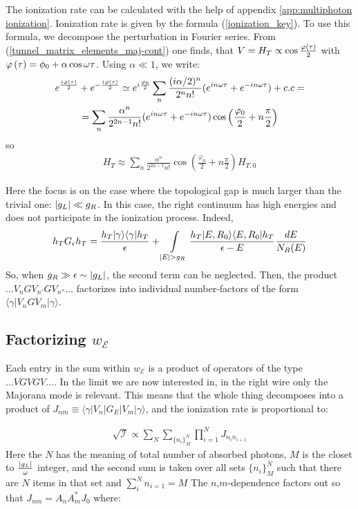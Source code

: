 The ionization rate can be calculated with the help of appendix \ref{app:multiphoton ionization}. Ionization rate is given by the formula   (\ref{ionization_key}). To use this formula, we decompose the  perturbation in Fourier series. From  (\ref{tunnel_matrix_elements_maj-cont}) one finds, that $ V=H_T\propto\cos\frac{\varphi\left(\tau\right)}{2} $ with $ \varphi\left(\tau\right)=\phi_{0}+\alpha\cos\omega \tau $. Using $ \alpha\ll1 $, we write:
\begin{multline}
	e^{\frac{i\varphi\left(\tau\right)}{2}}+e^{-\frac{i\varphi\left(\tau\right)}{2}}\simeq e^{i\frac{\varphi_{0}}{2}}\sum_{n}\frac{(i\alpha/2)^{n}}{2^{n}n!}(e^{in\omega \tau}+e^{-in\omega \tau})+c.c=
	\\
	=\sum_{n}\frac{\alpha{}^{n}}{2^{2n-1}n!}(e^{in\omega \tau}+e^{-in\omega \tau})\cos\left(\frac{\varphi_{0}}{2}+n\frac{\pi}{2}\right)
\end{multline}
so 
\begin{gather}
	H_T
	\approx
	\sum_{n}
	\frac{\alpha^{n}}{2^{2n-1}n!}\cos\left(\frac{\varphi_{0}}{2}+n\frac{\pi}{2}\right)H_{T,0}
\end{gather}

Here the focus is on the case where the topological gap is much larger than the trivial one: $ \left|g_L\right|\ll g_R $. In this case, the right continuum has high energies and does not participate in the ionization process. Indeed,
\begin{gather}
	h_T G_{\epsilon} h_T
	=
	\frac{h_T|\gamma\rangle\langle\gamma|h_T}{\epsilon}
	+
	\intop_{|E|>g_{R}}
	\frac{h_T|E,R_0\rangle\langle E,R_0|h_T}{\epsilon-E}\frac{dE}{N_{R}(E)}
\end{gather}
So, when $ g_{R}\gg\epsilon\sim \left|g_L\right| $, the second term can be neglected. Then, the product $ \dots V_{n}GV_{n'}GV_{n''}\dots $ factorizes into individual number-factors of the form $ \langle\gamma|V_{n}GV_{m}|\gamma\rangle $.

\subsection{Factorizing $ w_\mathcal{E} $}
Each entry in the sum within $ w_{\mathcal{E}} $ is a product of operators of the type $ \dots VGVGV\dots. $ In the limit we are now interested in, in the right wire only the Majorana mode is relevant. This means that the whole thing decomposes into a product of $ J_{nm}\equiv\langle\gamma|V_{n}|G_{E}|V_{m}|\gamma\rangle $, and the ionization rate is proportional to:

\begin{gather}
	\sqrt{\mathcal{I}}\propto
	\sum_N \sum_{\{n_i\}_M^N}\prod_{i=1}^{N}J_{n_in_{i+1}}
\end{gather}
Here the $ N $ has the meaning of total number of absorbed photons, $ M $ is the closet to $ \frac{\left|g_L\right|}{\omega }$ integer, and the second sum is taken over all sets $ \{n_i\}_M^N $ such that there are $ N $ items in that set and $ \sum_i^N n_{i=1} = M$
 The $ n $,$ m $-dependence factors out so that $ J_{nm}=A_{n}A_{m}^{*}J_{0} $ where:


